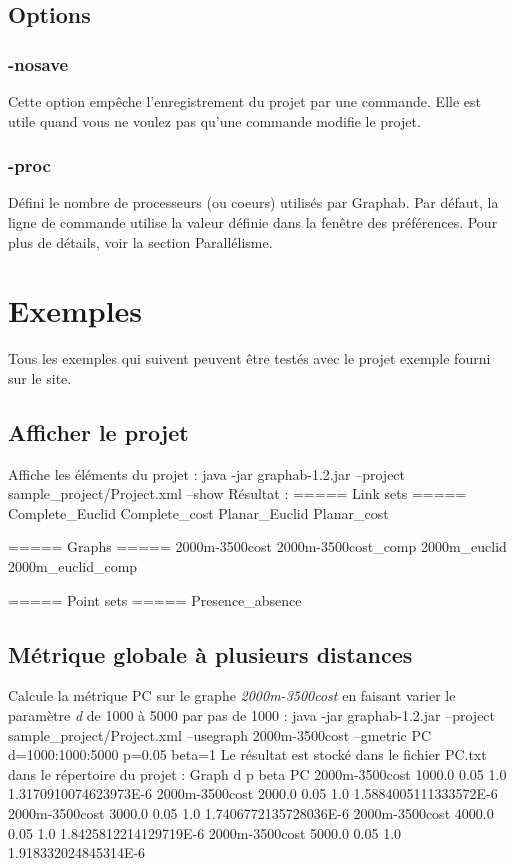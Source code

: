 \documentclass[a4paper,10pt]{report}
\newenvironment{cmd}
{\quote\Verbatim}
{\endVerbatim\endquote}
\begin{document}
\section{Options}
\subsection{-nosave}
Cette option empêche l'enregistrement du projet par une commande.
Elle est utile quand vous ne voulez pas qu'une commande modifie le projet.

\subsection{-proc}
Défini le nombre de processeurs (ou coeurs) utilisés par Graphab.
Par défaut, la ligne de commande utilise la valeur définie dans la fenêtre des préférences.
Pour plus de détails, voir la section Parallélisme.


\chapter{Exemples}
Tous les exemples qui suivent peuvent être testés avec le projet exemple fourni sur le site.

\section{Afficher le projet}
Affiche les éléments du projet :
\begin{cmd}
java -jar graphab-1.2.jar --project sample_project/Project.xml --show
\end{cmd}
Résultat :
\begin{cmd}
===== Link sets =====
Complete_Euclid
Complete_cost
Planar_Euclid
Planar_cost

===== Graphs =====
2000m-3500cost
2000m-3500cost_comp
2000m_euclid
2000m_euclid_comp

===== Point sets =====
Presence_absence
\end{cmd}

\section{Métrique globale à plusieurs distances}
Calcule la métrique PC sur le graphe \textit{2000m-3500cost} en faisant varier le paramètre \textit{d} de 1000 à 5000 par pas de 1000 :
\begin{cmd}
java -jar graphab-1.2.jar --project sample_project/Project.xml 
  --usegraph 2000m-3500cost --gmetric PC d=1000:1000:5000 p=0.05 beta=1
\end{cmd}
Le résultat est stocké dans le fichier PC.txt dans le répertoire du projet :
\begin{cmd}
Graph	d	p	beta	PC
2000m-3500cost	1000.0	0.05	1.0	1.3170910074623973E-6
2000m-3500cost	2000.0	0.05	1.0	1.5884005111333572E-6
2000m-3500cost	3000.0	0.05	1.0	1.7406772135728036E-6
2000m-3500cost	4000.0	0.05	1.0	1.8425812214129719E-6
2000m-3500cost	5000.0	0.05	1.0	1.918332024845314E-6
\end{cmd}
\end{document}
